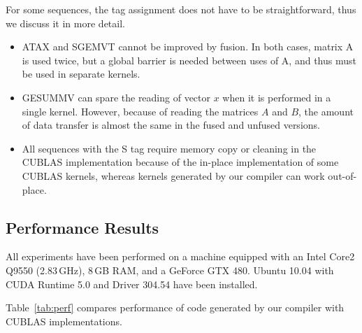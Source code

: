 \documentclass[final]{siamltex}
\begin{document}
{For some sequences, the tag assignment does not have to be straightforward, thus we discuss it in more detail.
\begin{itemize}
	\item ATAX and SGEMVT cannot be improved by fusion. In both cases, matrix A is used twice, but a global barrier is needed between uses of A, and thus must be used in separate kernels.
	\item GESUMMV can spare the reading of vector $x$ when it is performed in a single kernel. However, because of reading the matrices $A$ and $B$, the amount of data transfer is almost the same in the fused and unfused versions.
	\item All sequences with the S tag require memory copy or cleaning in the CUBLAS implementation because of the in-place implementation of some CUBLAS kernels, whereas kernels generated by our compiler can work out-of-place.
\end{itemize}

\subsection{Performance Results}

All experiments have been performed on a machine equipped with an Intel Core2 Q9550 (2.83\,GHz), 8\,GB RAM, and a GeForce GTX 480. Ubuntu 10.04 with CUDA Runtime 5.0 and Driver 304.54 have been installed.

Table~\ref{tab:perf} compares performance of code generated by our compiler with CUBLAS implementations.

}
\end{document}

